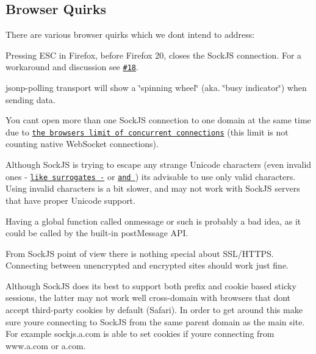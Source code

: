 \subsection*{Browser Quirks }

There are various browser quirks which we don\textquotesingle{}t intend to address\+:


\begin{DoxyItemize}
\item Pressing E\+SC in Firefox, before Firefox 20, closes the Sock\+JS connection. For a workaround and discussion see \href{https://github.com/sockjs/sockjs-client/issues/18}{\tt \#18}.
\item {\ttfamily jsonp-\/polling} transport will show a \char`\"{}spinning wheel\char`\"{} (aka. \char`\"{}busy indicator\char`\"{}) when sending data.
\item You can\textquotesingle{}t open more than one Sock\+JS connection to one domain at the same time due to \href{https://stackoverflow.com/questions/985431/max-parallel-http-connections-in-a-browser}{\tt the browser\textquotesingle{}s limit of concurrent connections} (this limit is not counting native Web\+Socket connections).
\item Although Sock\+JS is trying to escape any strange Unicode characters (even invalid ones -\/ \href{https://en.wikipedia.org/wiki/Mapping_of_Unicode_characters#Surrogates}{\tt like surrogates -\/} or \href{https://en.wikipedia.org/wiki/Unicode#Character_General_Category}{\tt and }) it\textquotesingle{}s advisable to use only valid characters. Using invalid characters is a bit slower, and may not work with Sock\+JS servers that have proper Unicode support.
\item Having a global function called {\ttfamily onmessage} or such is probably a bad idea, as it could be called by the built-\/in {\ttfamily post\+Message} A\+PI.
\item From Sock\+JS\textquotesingle{} point of view there is nothing special about S\+S\+L/\+H\+T\+T\+PS. Connecting between unencrypted and encrypted sites should work just fine.
\item Although Sock\+JS does its best to support both prefix and cookie based sticky sessions, the latter may not work well cross-\/domain with browsers that don\textquotesingle{}t accept third-\/party cookies by default (Safari). In order to get around this make sure you\textquotesingle{}re connecting to Sock\+JS from the same parent domain as the main site. For example \textquotesingle{}sockjs.\+a.\+com\textquotesingle{} is able to set cookies if you\textquotesingle{}re connecting from \textquotesingle{}www.\+a.\+com\textquotesingle{} or \textquotesingle{}a.\+com\textquotesingle{}.

\end{DoxyItemize}
